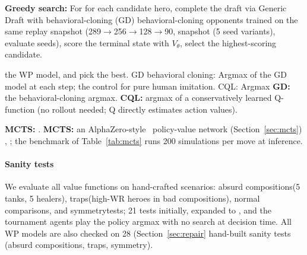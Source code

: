 \documentclass[journal]{IEEEtran}
\providecommand{\DIFaddtex}[1]{{\protect\color{blue} \sf #1}} %
\providecommand{\DIFdeltex}[1]{{\protect\color{red} \scriptsize #1}} %
\providecommand{\DIFaddbegin}{} %
\providecommand{\DIFaddend}{} %
\providecommand{\DIFdelbegin}{} %
\providecommand{\DIFdelend}{} %
\providecommand{\DIFadd}[1]{\texorpdfstring{\DIFaddtex{#1}}{#1}} %
\providecommand{\DIFdel}[1]{\texorpdfstring{\DIFdeltex{#1}}{}} %
\begin{document}
\textbf{Greedy\DIFdelbegin \DIFdel{search}\DIFdelend :} \DIFdelbegin \DIFdel{For }\DIFdelend \DIFaddbegin \DIFadd{for }\DIFaddend each candidate hero, complete the draft \DIFdelbegin \DIFdel{via Generic Draft }\DIFdelend \DIFaddbegin \DIFadd{with behavioral-cloning }\DIFaddend (GD) \DIFdelbegin \DIFdel{behavioral-cloning }\DIFdelend opponents trained on the \DIFdelbegin \DIFdel{same replay snapshot (289$\to$256$\to$128$\to$90, }\DIFdelend \DIFaddbegin \DIFadd{snapshot (}\DIFaddend 5 \DIFdelbegin \DIFdel{seed variants), evaluate }\DIFdelend \DIFaddbegin \DIFadd{seeds), score }\DIFaddend the terminal state with \DIFdelbegin \DIFdel{$V_\theta$, select the highest-scoring candidate. }%

\DIFdelend \DIFaddbegin \DIFadd{the WP model, and pick the best. }\DIFaddend \DIFdelbegin \DIFdel{GD behavioral cloning: Argmax of the GD model at each step; the control for pure human imitation. CQL: Argmax }\DIFdelend \DIFaddbegin \DIFadd{\textbf{GD:} the behavioral-cloning argmax. \textbf{CQL:} argmax }\DIFaddend of a conservatively learned Q-function\DIFdelbegin \DIFdel{(no rollout needed; Q directly estimates action values). }%

\DIFdel{\textbf{MCTS:} }\DIFdelend \DIFaddbegin \DIFadd{. \textbf{MCTS:} an }\DIFaddend AlphaZero-style~\cite{silver2018general} policy-value network (Section~\ref{sec:mcts})\DIFdelbegin \DIFdel{, }\DIFdelend \DIFaddbegin \DIFadd{; the benchmark of Table~\ref{tab:mcts} runs }\DIFaddend 200 simulations per move\DIFdelbegin \DIFdel{at inference. }%

\paragraph{\DIFdel{Sanity tests}} %
\addtocounter{paragraph}{-1}%
\DIFdel{We evaluate all value functions on hand-crafted scenarios: absurd compositions(5 tanks, 5 healers), traps(high-WR heroes in bad compositions), normal comparisons, and symmetrytests; 21 tests initially, expanded to }\DIFdelend \DIFaddbegin \DIFadd{, and the tournament agents play the policy argmax with no search at decision time. All WP models are also checked on }\DIFaddend 28 \DIFdelbegin \DIFdel{(Section~\ref{sec:repair}}\DIFdelend \DIFaddbegin \DIFadd{hand-built sanity tests (absurd compositions, traps, symmetry}\DIFaddend ).
\end{document}
